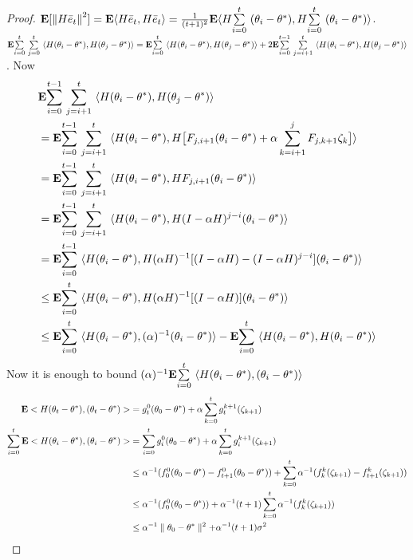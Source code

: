 \begin{proof}
$\E[\norm{H\eb_t}^2]=\E\ip{H\eb_t,H\eb_t}=\frac{1}{(t+1)^2}\E\ip{H\ous{\sum}{i=0}{t}(\theta_i-\ts),H\ous{\sum}{i=0}{t}(\theta_i-\ts)}$.
$\E\ous{\sum}{i=0}{t}\ous{\sum}{j=0}{t}\ip{H(\theta_i-\theta^*),H(\theta_j-\theta^*)}=\E\ous{\sum}{i=0}{t}\ip{H(\theta_i-\theta^*),H(\theta_j-\theta^*)}+ 2\E\ous{\sum}{i=0}{t-1}\ous{\sum}{j=i+1}{t}\ip{H(\theta_i-\theta^*),H(\theta_j-\theta^*)}$. Now
\begin{align}\label{inter}
&\E\ous{\sum}{i=0}{t-1}\ous{\sum}{j=i+1}{t}\ip{H(\theta_i-\theta^*),H(\theta_j-\theta^*)}\nn\\
&=\E\ous{\sum}{i=0}{t-1}\ous{\sum}{j=i+1}{t}\ip{H(\theta_i-\theta^*),H\big[F_{j,i+1} (\theta_i-\theta^*)+\alpha\sum_{k=i+1}^j F_{j,k+1}\zeta_{k}\big]}\nn\\
&=\E\ous{\sum}{i=0}{t-1}\ous{\sum}{j=i+1}{t}\ip{H(\theta_i-\theta^*),H F_{j,i+1} (\theta_i-\theta^*)}\nn\\
&=\E\ous{\sum}{i=0}{t-1}\ous{\sum}{j=i+1}{t}\ip{H(\theta_i-\theta^*),H(I-\alpha H)^{j-i} (\theta_i-\theta^*)}\nn\\
&=\E\ous{\sum}{i=0}{t-1}\ip{H(\theta_i-\theta^*),H(\alpha H)^{-1}[(I-\alpha H)-(I-\alpha H)^{j-i}] (\theta_i-\theta^*)}\nn\\
&\leq \E\ous{\sum}{i=0}{t}\ip{H(\theta_i-\theta^*),H(\alpha H)^{-1}[(I-\alpha H)] (\theta_i-\theta^*)}\nn\\
&\leq \E\ous{\sum}{i=0}{t}\ip{H(\theta_i-\theta^*),(\alpha)^{-1} (\theta_i-\theta^*)}- \E\ous{\sum}{i=0}{t}\ip{H(\theta_i-\theta^*),H(\theta_i-\theta^*)}\nn\\
\end{align}
Now it is enough to bound $(\alpha)^{-1} \E\ous{\sum}{i=0}{t}\ip{H(\theta_i-\theta^*),(\theta_i-\theta^*)}$
\begin{align*}
\E<H(\theta_t-\theta^*),(\theta_t-\theta^*)>&=g^0_t(\theta_0-\theta^*)+\alpha\sum_{k=0}^t g^{k+1}_t(\zeta_{k+1})\\
\sum_{i=0}^t\E<H(\theta_i-\theta^*),(\theta_i-\theta^*)>&=\sum_{i=0}^t g^0_i(\theta_0-\theta^*)+\alpha\sum_{k=0}^t g^{k+1}_i(\zeta_{k+1})\\
&\leq\alpha^{-1}(f^0_0(\theta_0-\ts)-f^0_{t+1}(\theta_0-\ts))+\sum_{k=0}^t \alpha^{-1}(f^k_k(\zeta_{k+1})-f^k_{t+1}(\zeta_{k+1}))\\
&\leq\alpha^{-1}(f^0_0(\theta_0-\ts))+\alpha^{-1}(t+1)\sum_{k=0}^t \alpha^{-1}(f^k_k(\zeta_{k+1}))\\
&\leq\alpha^{-1}\parallel \theta_0-\ts\parallel^2+\alpha^{-1}(t+1)\sigma^2
\end{align*}
\end{proof}



